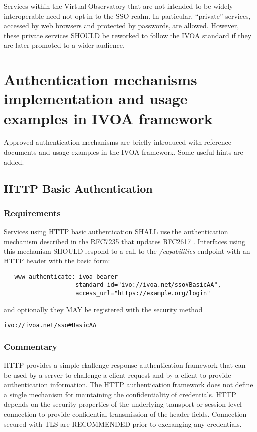 \documentclass[11pt,a4paper]{ivoa}
\begin{document}
Services within the Virtual Observatory that are not intended to be
widely interoperable need not opt in to the SSO realm.
In particular, ``private'' services, accessed by web browsers and
protected by passwords, are allowed.
However, these private services SHOULD be reworked to follow the IVOA
standard if they are later promoted to a wider audience.


\section{Authentication mechanisms implementation and usage examples in 
IVOA framework}

Approved authentication mechanisms are briefly introduced with reference
documents and usage examples in the IVOA framework. Some useful hints 
are added.

\subsection{HTTP Basic Authentication}
\subsubsection{Requirements}
Services using HTTP basic authentication SHALL use the authentication
mechanism described in the RFC7235 \citep{std:RFC7235}
that updates RFC2617 \citep{std:RFC2617}.
Interfaces using this mechanism SHOULD respond to a call to the 
\emph{/capabilities} endpoint with an HTTP header with the basic form:
\begin{verbatim}
   www-authenticate: ivoa_bearer 
                    standard_id="ivo://ivoa.net/sso#BasicAA",
                    access_url="https://example.org/login"
\end{verbatim}
and optionally they MAY be registered with the security
method
 
 \texttt{ivo://ivoa.net/sso\#BasicAA}

\subsubsection{Commentary}
HTTP provides a simple challenge-response authentication framework that
can be used by a server to challenge
a client request and by a   client to provide authentication
information.
The HTTP authentication framework does not define a single mechanism for
maintaining the confidentiality of credentials.
HTTP depends on the security properties of the underlying transport or
session-level connection to provide
confidential transmission of the header fields. Connection secured with
TLS are RECOMMENDED prior to exchanging any credentials.
\end{document}
